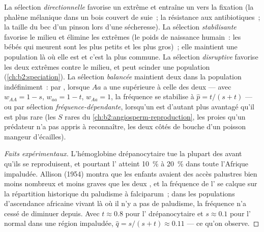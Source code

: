 \begin{proposition}\label{prop:b2:population-genetics:kinds}
La sélection \emph{directionnelle} favorise un extrême et entraîne un
 vers la fixation (la phalène mélanique dans un bois couvert de
suie~; la résistance aux antibiotiques~; la taille du bec d'un pinson
lors d'une sécheresse).
La sélection \emph{stabilisante} favorise le milieu et élimine les
extrêmes (le poids de naissance humain~: les bébés qui meurent sont les
plus petits et les plus gros)~; elle maintient une population là où elle
est et c'est la plus commune. La sélection \emph{disruptive} favorise les
deux extrêmes contre le milieu, et peut scinder une population
(\cref{ch:b2:speciation}). La sélection \emph{balancée} maintient deux
 dans la population indéfiniment~: par \emph{}, lorsque $Aa$ a une  supérieure à celle
des deux  --- avec
$w_{AA} = 1 - s$, $w_{aa} = 1 - t$, $w_{Aa} = 1$, la fréquence
se stabilise à $\hat p = t/(s + t)$ --- ou par sélection
\emph{fréquence-dépendante}, lorsqu'un  est d'autant plus avantagé
qu'il est plus rare (les 
$S$ rares du \cref{ch:b2:angiosperm-reproduction}, les proies qu'un
prédateur n'a pas appris à reconnaître, les deux côtés de bouche d'un
poisson mangeur d'écailles).
\end{proposition}
\begin{proof}[Faits expérimentaux]
L'hémoglobine drépanocytaire tue la plupart des  avant qu'ils
se reproduisent, et pourtant l' atteint \qty{10}{\%} à \qty{20}{\%}
dans toute l'Afrique impaludée. Allison (1954) montra que les enfants
 avaient des accès palustres bien moins nombreux et moins
graves que les deux , et la fréquence de l' se calque
sur la répartition historique du paludisme à falciparum~; dans les
populations d'ascendance africaine vivant là où il n'y a pas de
paludisme, la fréquence n'a cessé de diminuer depuis. Avec $t \approx 0.8$ pour l'
drépanocytaire et $s \approx 0.1$ pour l' normal dans une région
impaludée, $\hat q = s/(s + t) \approx 0.11$ --- ce qu'on observe.
\end{proof}

